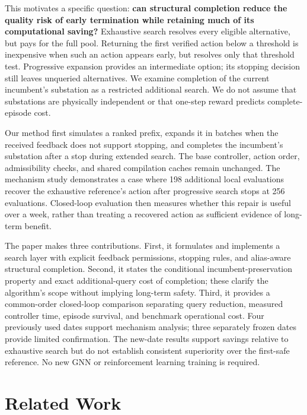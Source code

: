 This motivates a specific question: \textbf{can structural completion reduce the quality risk of early termination while retaining much of its computational saving?} Exhaustive search resolves every eligible alternative, but pays for the full pool. Returning the first verified action below a threshold is inexpensive when such an action appears early, but resolves only that threshold test. Progressive expansion provides an intermediate option; its stopping decision still leaves unqueried alternatives. We examine completion of the current incumbent's substation as a restricted additional search. We do not assume that substations are physically independent or that one-step reward predicts complete-episode cost.


Our method first simulates a ranked prefix, expands it in batches when the received feedback does not support stopping, and completes the incumbent's substation after a stop during extended search. The base controller, action order, admissibility checks, and shared compilation caches remain unchanged. The mechanism study demonstrates a case where 198 additional local evaluations recover the exhaustive reference's action after progressive search stops at 256 evaluations. Closed-loop evaluation then measures whether this repair is useful over a week, rather than treating a recovered action as sufficient evidence of long-term benefit.


The paper makes three contributions. First, it formulates and implements a search layer with explicit feedback permissions, stopping rules, and alias-aware structural completion. Second, it states the conditional incumbent-preservation property and exact additional-query cost of completion; these clarify the algorithm's scope without implying long-term safety. Third, it provides a common-order closed-loop comparison separating query reduction, measured controller time, episode survival, and benchmark operational cost. Four previously used dates support mechanism analysis; three separately frozen dates provide limited confirmation. The new-date results support savings relative to exhaustive search but do not establish consistent superiority over the first-safe reference. No new GNN or reinforcement learning training is required.


\section{Related Work}

